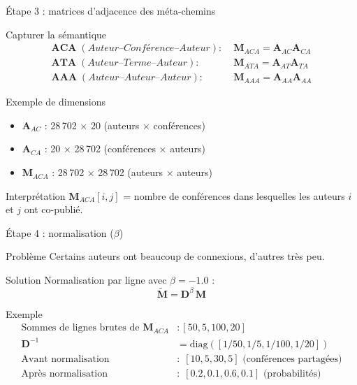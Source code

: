 \documentclass[9pt,aspectratio=169,professionalfonts]{beamer}
\begin{document}
\begin{frame}{Étape 3 : matrices d'adjacence des méta-chemins}
\begin{block}{Capturer la sémantique}
\begin{align}
\textbf{ACA}\; (Auteur–Conférence–Auteur): &\; \mathbf M_{ACA} = \mathbf A_{AC}\mathbf A_{CA}\\
\textbf{ATA}\; (Auteur–Terme–Auteur): &\; \mathbf M_{ATA} = \mathbf A_{AT}\mathbf A_{TA}\\
\textbf{AAA}\; (Auteur–Auteur–Auteur): &\; \mathbf M_{AAA} = \mathbf A_{AA}\mathbf A_{AA}
\end{align}
\end{block}

\begin{block}{Exemple de dimensions}
\begin{itemize}
    \item $\mathbf A_{AC}$ : 28\,702 × 20 (auteurs × conférences)
    \item $\mathbf A_{CA}$ : 20 × 28\,702 (conférences × auteurs)
    \item $\mathbf M_{ACA}$ : 28\,702 × 28\,702 (auteurs × auteurs)
\end{itemize}
\end{block}

\begin{block}{Interprétation}
$\mathbf M_{ACA}[i,j]$ = nombre de conférences dans lesquelles les auteurs $i$ et $j$ ont co-publié.
\end{block}
\end{frame}

\begin{frame}{Étape 4 : normalisation ($\beta$)}
\begin{alertblock}{Problème}
Certains auteurs ont beaucoup de connexions, d'autres très peu.
\end{alertblock}

\begin{block}{Solution}
Normalisation par ligne avec $\beta=-1.0$ :
$$\boxed{\tilde{\mathbf M} = \mathbf D^{\beta}\,\mathbf M}$$
\end{block}

\begin{exampleblock}{Exemple}
\begin{align*}
\text{Sommes de lignes brutes de }\mathbf M_{ACA} &: [50, 5, 100, 20] \\[-2pt]
\mathbf D^{-1} &= \text{diag}([1/50, 1/5, 1/100, 1/20])\\[4pt]
\text{Avant normalisation} &: \; [10, 5, 30, 5] \text{ (conférences partagées)}\\[2pt]
\text{Après normalisation} &: \; [0.2, 0.1, 0.6, 0.1] \text{ (probabilités)}
\end{align*}
\end{exampleblock}
\end{frame}
\end{document}
